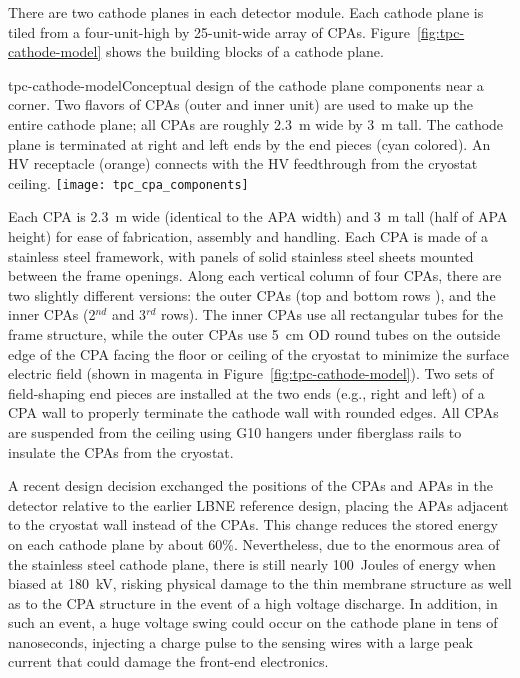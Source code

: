 There are two cathode planes in each detector module.  Each cathode plane is 
tiled from a four-unit-high by 25-unit-wide array of CPAs. Figure~\ref{fig:tpc-cathode-model} shows the
building blocks of a cathode plane.  
\begin{cdrfigure} 
{tpc-cathode-model}{Conceptual design of the cathode plane 
components near a corner.  Two flavors of CPAs (outer 
and inner unit) are used to make up the entire cathode plane; all
CPAs are roughly 2.3~m wide by 3~m tall. 
The cathode plane is terminated at
right and left ends by the end pieces (cyan colored).  An HV receptacle 
(orange) connects with the HV feedthrough from the cryostat ceiling. }
\texttt{[image: tpc\_cpa\_components]}
\end{cdrfigure}

Each CPA is 2.3~m wide (identical to the APA width) and 3~m tall (half
of APA height) for ease of fabrication, assembly and handling.  Each
CPA is made of a stainless steel framework, with panels of solid
stainless steel sheets mounted between the frame openings.  Along each
vertical column of four CPAs, there are two slightly different
versions: the outer CPAs (top and bottom rows ), and the inner CPAs
(2$^{nd}$ and 3$^{rd}$ rows).  The inner CPAs use all rectangular
tubes for the frame structure, while the outer CPAs use 5~cm OD round
tubes on the outside edge of the CPA facing the floor or ceiling of
the cryostat to minimize the surface electric field (shown in magenta in
  Figure~\ref{fig:tpc-cathode-model}).  Two sets of field-shaping
end pieces are installed at the two ends (e.g., right and left) of a
CPA wall to properly terminate the cathode wall with rounded edges.
All CPAs are suspended from the ceiling using G10 hangers under
fiberglass rails to insulate the CPAs from the cryostat.

A recent design decision exchanged the positions of the CPAs and APAs
in the detector relative to the earlier LBNE reference design, placing
the APAs adjacent to the cryostat wall instead of the CPAs.  This
change reduces the stored energy on each cathode plane by about 60\%.
Nevertheless, due to the enormous area of the stainless steel cathode
plane, there is still nearly 100~Joules of energy when biased at
180~kV, risking physical damage to the thin membrane structure as well
as to the CPA structure in the event of a high voltage discharge.  In
addition, in such an event, a huge voltage swing could occur on the
cathode plane in tens of nanoseconds, injecting a charge pulse to the
sensing wires with a large peak current that could damage the
front-end electronics.

